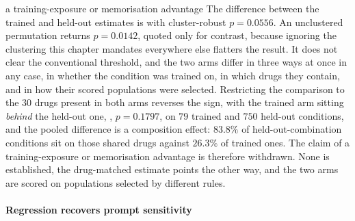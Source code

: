 %
\begin{withdrawn}{a training-exposure or memorisation advantage}
The difference between the trained and held-out estimates is
 with cluster-robust $p = 0.0556$. An unclustered
permutation returns $p = 0.0142$, quoted only for contrast, because ignoring the
clustering this chapter mandates everywhere else flatters the result. It does
not clear the conventional threshold, and the two arms differ in three ways at
once in any case, in whether the condition was trained on, in which drugs they
contain, and in how their scored populations were selected. Restricting the
comparison to the $30$ drugs present in both arms reverses the sign, with the
trained arm sitting \emph{behind} the held-out one,
, $p = 0.1797$, on $79$ trained and $750$
held-out conditions, and the pooled difference is a composition effect: $83.8\%$
of held-out-combination conditions sit on those shared drugs against $26.3\%$
of trained ones. The claim of a training-exposure or memorisation advantage is
therefore withdrawn. None is established, the drug-matched estimate points the
other way, and the two arms are scored on populations selected by different
rules.
\end{withdrawn}

\paragraph{Regression recovers prompt sensitivity} 

